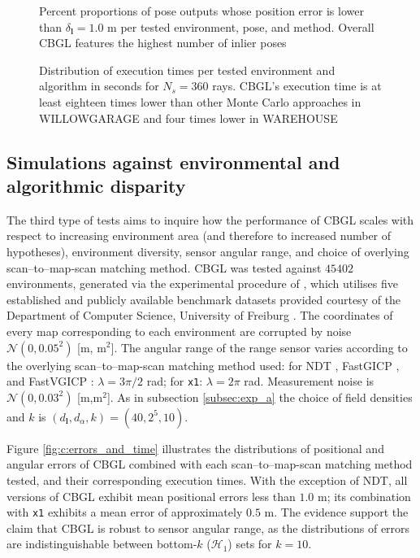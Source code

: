 \begin{figure}
  
  \caption{\small Percent proportions of pose outputs whose position error is
           lower than $\delta_{\bm{l}} = 1.0$ m per tested environment, pose,
           and method. Overall CBGL features the highest number of inlier poses}
  \label{fig:b:inliers_per_pose}
\end{figure}

\begin{figure}
  
  \vspace{0.1cm}
  \caption{\small Distribution of execution times per tested environment and
           algorithm in seconds for $N_s = 360$ rays. CBGL's execution time is
           at least eighteen times lower than other Monte Carlo approaches in
           WILLOWGARAGE and four times lower in WAREHOUSE}
  \label{fig:b:execution_times}
\end{figure}


\subsection{Simulations against environmental and algorithmic disparity }
\label{subsec:exp_c}

The third type of tests aims to inquire how the performance of CBGL scales with
respect to increasing environment area (and therefore to increased number of
hypotheses), environment diversity, sensor angular range, and choice of
overlying scan--to--map-scan matching method. CBGL was tested against $45402$
environments, generated via the experimental procedure of
\cite{Filotheou2023a}, which utilises five established and publicly available
benchmark datasets provided courtesy of the Department of Computer Science,
University of Freiburg \cite{datasets_link}. The coordinates of every map
corresponding to each environment are corrupted by noise
$\mathcal{N}(0,0.05^2)$ [m, m$^2$]. The angular range of the range sensor
varies according to the overlying scan--to--map-scan matching method used: for
NDT \cite{ndt}, FastGICP \cite{fgi}, and FastVGICP \cite{fvg}: $\lambda =
3\pi/2$ rad; for \texttt{x1}: $\lambda = 2\pi$ rad. Measurement noise is
$\mathcal{N}(0,0.03^2)$ [m,m$^2$]. As in subsection \ref{subsec:exp_a}
the choice of field densities and $k$ is $(d_{\bm{l}},d_{\alpha},k) = (40, 2^5,
10)$.

Figure \ref{fig:c:errors_and_time} illustrates the distributions of positional
and angular errors of CBGL combined with each scan--to--map-scan matching
method tested, and their corresponding execution times. With the exception of
NDT, all versions of CBGL exhibit mean positional errors less than $1.0$ m; its
combination with \texttt{x1} exhibits a mean error of approximately $0.5$ m.
The evidence support the claim that CBGL is robust to sensor angular range,
as the distributions of errors are indistinguishable between bottom-$k$
($\mathcal{H}_1$) sets for $k=10$.

